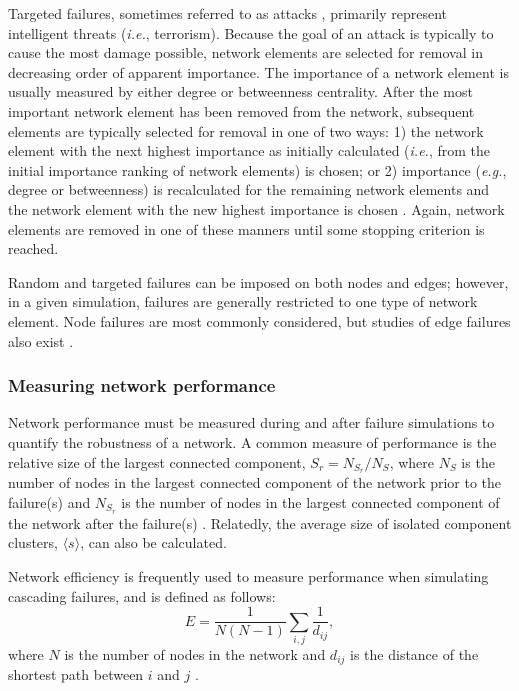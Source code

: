 Targeted failures, sometimes referred to as attacks \cite{Albert2000}, primarily represent intelligent threats (\emph{i.e.}, terrorism).  Because the goal of an attack is typically to cause the most damage possible, network elements are selected for removal in decreasing order of apparent importance.  The importance of a network element is usually measured by either degree or betweenness centrality.  After the most important network element has been removed from the network, subsequent elements are typically selected for removal in one of two ways: 1) the network element with the next highest importance as initially calculated (\emph{i.e.}, from the initial importance ranking of network elements) is chosen; or 2) importance (\emph{e.g.}, degree or betweenness) is recalculated for the remaining network elements and the network element with the new highest importance is chosen \cite{Holme2002}.  Again, network elements are removed in one of these manners until some stopping criterion is reached.

Random and targeted failures can be imposed on both nodes and edges; however, in a given simulation, failures are generally restricted to one type of network element.  Node failures are most commonly considered, but studies of edge failures also exist \cite{Holme2002,Motter2002b,Pepyne2007,Simonsen2008}.


\subsubsection{Measuring network performance}

Network performance must be measured during and after failure simulations to quantify the robustness of a network.  A common measure of performance is the relative size of the largest connected component, $S_{r}=N_{S_{r}}/N_{S}$, where $N_{S}$ is the number of nodes in the largest connected component of the network prior to the failure(s) and $N_{S_r}$ is the number of nodes in the largest connected component of the network after the failure(s) \cite{Albert2000,Estrada2006,Holme2002,Holmgren2006a,Motter2002a,Rosas-Casals2007,Shoji2009,Simonsen2008,Winkler2010}.  Relatedly, the average size of isolated component clusters, $\langle s \rangle$, can also be calculated.

Network efficiency is frequently used to measure performance when simulating cascading failures, and is defined as follows:
%
\begin{equation}
E=\frac{1}{N(N-1)}\sum\limits_{i,j} \frac{1}{d_{ij}},
\end{equation}
%
where $N$ is the number of nodes in the network and $d_{ij}$ is the distance of the shortest path between $i$ and $j$ \cite{Crucitti2004a,Crucitti2004b,Kinney2005,Motter2002b}.

